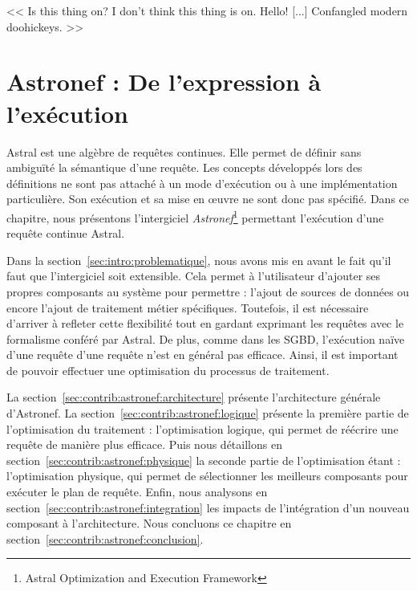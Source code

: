 \begin{savequote}[6cm]
<< Is this thing on? I don't think this thing is on. Hello! [...] Confangled modern doohickeys. >>
\end{savequote}

\chapter{Astronef : De l'expression à l'exécution}\label{chap:contrib:astronef}
\chaptertoc

Astral est une algèbre de requêtes continues. Elle permet de définir sans ambiguïté la sémantique d'une requête. Les concepts développés lors des définitions ne sont pas attaché à un mode d'exécution ou à une implémentation particulière. Son exécution et sa mise en œuvre ne sont donc pas spécifié. Dans ce chapitre, nous présentons l'intergiciel \textit{Astronef}\footnote{Astral Optimization and Execution Framework} permettant l'exécution d'une requête continue Astral.

Dans la section~\ref{sec:intro:problematique}, nous avons mis en avant le fait qu'il faut que l'intergiciel soit extensible. Cela permet à l'utilisateur d'ajouter ses propres composants au système pour permettre : l'ajout de sources de données ou encore l'ajout de traitement métier spécifiques. Toutefois, il est nécessaire d'arriver à refleter cette flexibilité tout en gardant exprimant les requêtes avec le formalisme conféré par Astral. De plus, comme dans les SGBD, l'exécution naïve d'une requête d'une requête n'est en général pas efficace. Ainsi, il est important de pouvoir effectuer une optimisation du processus de traitement.

La section~\ref{sec:contrib:astronef:architecture} présente l'architecture générale d'Astronef. La section~\ref{sec:contrib:astronef:logique} présente la première partie de l'optimisation du traitement : l'optimisation logique, qui permet de réécrire une requête de manière plus efficace. Puis nous détaillons en section~\ref{sec:contrib:astronef:physique} la seconde partie de l'optimisation étant : l'optimisation physique, qui permet de sélectionner les meilleurs composants pour exécuter le plan de requête. Enfin, nous analysons en section~\ref{sec:contrib:astronef:integration} les impacts de l'intégration d'un nouveau composant à l'architecture. Nous concluons ce chapitre en section~\ref{sec:contrib:astronef:conclusion}.

\lstset{language=PrologAstral}





